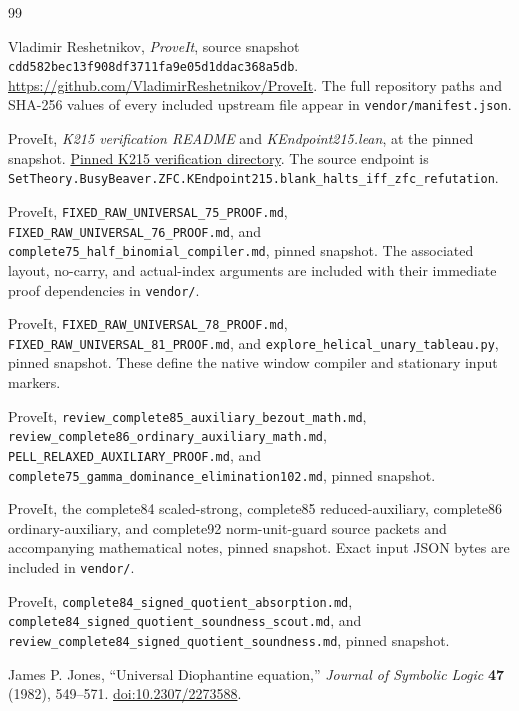 \documentclass[11pt,a4paper]{article}
\theoremstyle{remark}
\newcommand{\code}[1]{\nolinkurl{#1}}
\newcommand{\repo}{\url{https://github.com/VladimirReshetnikov/ProveIt}}
\newcommand{\commit}{\code{cdd582bec13f908df3711fa9e05d1ddac368a5db}}
\begin{document}
\begingroup\small

\endgroup

\clearpage
\begingroup\small
\begin{thebibliography}{99}
Vladimir Reshetnikov, \emph{ProveIt}, source snapshot
\commit. \repo.
The full repository paths and SHA-256 values of every included upstream
file appear in \code{vendor/manifest.json}.

ProveIt, \emph{K215 verification README} and
\emph{KEndpoint215.lean}, at the pinned snapshot.
\href{https://github.com/VladimirReshetnikov/ProveIt/tree/cdd582bec13f908df3711fa9e05d1ddac368a5db/Computability/BusyBeaver/Research/ZFC/k225-formal/verification/k215}{Pinned K215 verification directory}.
The source endpoint is
\code{SetTheory.BusyBeaver.ZFC.KEndpoint215.blank_halts_iff_zfc_refutation}.

ProveIt, \code{FIXED_RAW_UNIVERSAL_75_PROOF.md},
\code{FIXED_RAW_UNIVERSAL_76_PROOF.md},
and \code{complete75_half_binomial_compiler.md}, pinned snapshot.
The associated layout, no-carry, and actual-index arguments are included
with their immediate proof dependencies in \code{vendor/}.

ProveIt, \code{FIXED_RAW_UNIVERSAL_78_PROOF.md},
\code{FIXED_RAW_UNIVERSAL_81_PROOF.md}, and
\code{explore_helical_unary_tableau.py}, pinned snapshot.
These define the native window compiler and stationary input markers.

ProveIt, \code{review_complete85_auxiliary_bezout_math.md},
\code{review_complete86_ordinary_auxiliary_math.md},
\code{PELL_RELAXED_AUXILIARY_PROOF.md}, and
\code{complete75_gamma_dominance_elimination102.md}, pinned snapshot.

ProveIt, the complete84 scaled-strong, complete85 reduced-auxiliary,
complete86 ordinary-auxiliary, and complete92 norm-unit-guard source
packets and accompanying mathematical notes, pinned snapshot.
Exact input JSON bytes are included in \code{vendor/}.

ProveIt, \code{complete84_signed_quotient_absorption.md},
\code{complete84_signed_quotient_soundness_scout.md}, and
\code{review_complete84_signed_quotient_soundness.md}, pinned snapshot.

James P. Jones, ``Universal Diophantine equation,''
\emph{Journal of Symbolic Logic} \textbf{47} (1982), 549--571.
\href{https://doi.org/10.2307/2273588}{doi:10.2307/2273588}.


\end{thebibliography}
\end{document}
